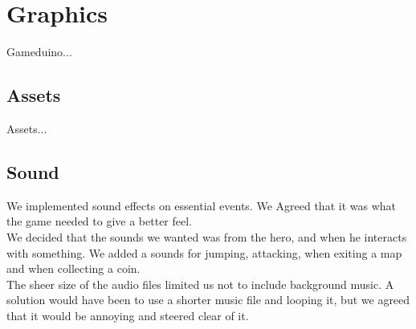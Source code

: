 \section{Graphics}
Gameduino...

\subsection{Assets}
Assets...
\subsection{Sound} %
We implemented sound effects on essential events. We Agreed that it was what the game needed to give a better feel.\\
We decided that the sounds we wanted was from the hero, and when he interacts with something. We added a sounds for jumping, attacking, when exiting a map and when collecting a coin.\\
 The sheer size of the audio files limited us not to include background music. A solution would have been to use a shorter music file and looping it, but we agreed that it would be annoying and steered clear of it.
